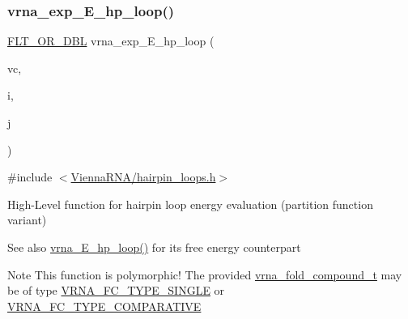 \subsubsection{\texorpdfstring{vrna\+\_\+exp\+\_\+\+E\+\_\+hp\+\_\+loop()}{vrna\_exp\_E\_hp\_loop()}}
{\footnotesize\ttfamily \hyperlink{group__data__structures_ga31125aeace516926bf7f251f759b6126}{F\+L\+T\+\_\+\+O\+R\+\_\+\+D\+BL} vrna\+\_\+exp\+\_\+\+E\+\_\+hp\+\_\+loop (\begin{DoxyParamCaption}\item[{\hyperlink{group__fold__compound_ga1b0cef17fd40466cef5968eaeeff6166}{vrna\+\_\+fold\+\_\+compound\+\_\+t} $\ast$}]{vc,  }\item[{int}]{i,  }\item[{int}]{j }\end{DoxyParamCaption})}



{\ttfamily \#include $<$\hyperlink{hairpin__loops_8h}{Vienna\+R\+N\+A/hairpin\+\_\+loops.\+h}$>$}



High-\/\+Level function for hairpin loop energy evaluation (partition function variant) 

\begin{DoxySeeAlso}{See also}
\hyperlink{group__loops_ga999ba163a8148d72fd5f22819a681df7}{vrna\+\_\+\+E\+\_\+hp\+\_\+loop()} for it\textquotesingle{}s free energy counterpart
\end{DoxySeeAlso}
\begin{DoxyNote}{Note}
This function is polymorphic! The provided \hyperlink{group__fold__compound_ga1b0cef17fd40466cef5968eaeeff6166}{vrna\+\_\+fold\+\_\+compound\+\_\+t} may be of type \hyperlink{group__fold__compound_gga01a4ff86fa71deaaa5d1abbd95a1447da7e264dd3cf2dc9b6448caabcb7763cd6}{V\+R\+N\+A\+\_\+\+F\+C\+\_\+\+T\+Y\+P\+E\+\_\+\+S\+I\+N\+G\+LE} or \hyperlink{group__fold__compound_gga01a4ff86fa71deaaa5d1abbd95a1447dab821ce46ea3cf665be97df22a76f5023}{V\+R\+N\+A\+\_\+\+F\+C\+\_\+\+T\+Y\+P\+E\+\_\+\+C\+O\+M\+P\+A\+R\+A\+T\+I\+VE} 
\end{DoxyNote}
\mbox{\label{group__loops_ga6c4ba14d24f716d0ca9021771357e903}} 
